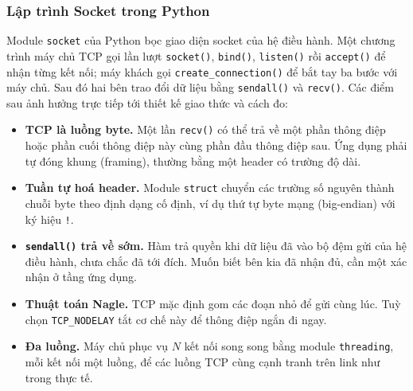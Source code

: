 \subsubsection{Lập trình Socket trong Python}
Module \texttt{socket} của Python bọc giao diện socket của hệ điều hành. Một chương trình máy chủ TCP gọi lần lượt \texttt{socket()}, \texttt{bind()}, \texttt{listen()} rồi \texttt{accept()} để nhận từng kết nối; máy khách gọi \texttt{create\_connection()} để bắt tay ba bước với máy chủ. Sau đó hai bên trao đổi dữ liệu bằng \texttt{sendall()} và \texttt{recv()}. Các điểm sau ảnh hưởng trực tiếp tới thiết kế giao thức và cách đo:
\begin{itemize}
    \item \textbf{TCP là luồng byte.} Một lần \texttt{recv()} có thể trả về một phần thông điệp hoặc phần cuối thông điệp này cùng phần đầu thông điệp sau. Ứng dụng phải tự đóng khung (framing), thường bằng một header có trường độ dài.
    \item \textbf{Tuần tự hoá header.} Module \texttt{struct} chuyển các trường số nguyên thành chuỗi byte theo định dạng cố định, ví dụ thứ tự byte mạng (big-endian) với ký hiệu \texttt{!}.
    \item \textbf{\texttt{sendall()} trả về sớm.} Hàm trả quyền khi dữ liệu đã vào bộ đệm gửi của hệ điều hành, chưa chắc đã tới đích. Muốn biết bên kia đã nhận đủ, cần một xác nhận ở tầng ứng dụng.
    \item \textbf{Thuật toán Nagle.} TCP mặc định gom các đoạn nhỏ để gửi cùng lúc. Tuỳ chọn \texttt{TCP\_NODELAY} tắt cơ chế này để thông điệp ngắn đi ngay.
    \item \textbf{Đa luồng.} Máy chủ phục vụ $N$ kết nối song song bằng module \texttt{threading}, mỗi kết nối một luồng, để các luồng TCP cùng cạnh tranh trên link như trong thực tế.
\end{itemize}

